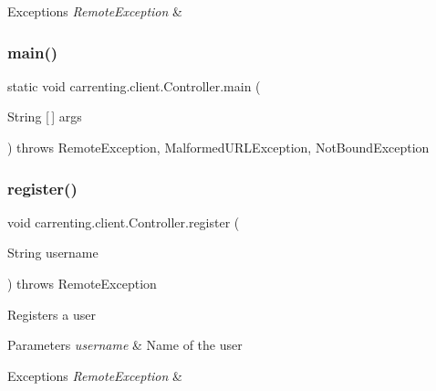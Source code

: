 \begin{DoxyExceptions}{Exceptions}
{\em Remote\+Exception} & \\
\hline
\end{DoxyExceptions}
\mbox{\label{classcarrenting_1_1client_1_1_controller_acff3740c4a8e0d3788748ac27206b371}} 
\subsubsection{\texorpdfstring{main()}{main()}}
{\footnotesize\ttfamily static void carrenting.\+client.\+Controller.\+main (\begin{DoxyParamCaption}\item[{String \mbox{[}$\,$\mbox{]}}]{args }\end{DoxyParamCaption}) throws Remote\+Exception, Malformed\+U\+R\+L\+Exception, Not\+Bound\+Exception\hspace{0.3cm}{\ttfamily [static]}}

\mbox{\label{classcarrenting_1_1client_1_1_controller_a642d9b66b13dcba6c1843c0bee2f060e}} 
\subsubsection{\texorpdfstring{register()}{register()}}
{\footnotesize\ttfamily void carrenting.\+client.\+Controller.\+register (\begin{DoxyParamCaption}\item[{String}]{username }\end{DoxyParamCaption}) throws Remote\+Exception}

Registers a user


\begin{DoxyParams}{Parameters}
{\em username} & Name of the user \\
\hline
\end{DoxyParams}

\begin{DoxyExceptions}{Exceptions}
{\em Remote\+Exception} & \\
\hline
\end{DoxyExceptions}
\mbox{\label{classcarrenting_1_1client_1_1_controller_a267c24a1a13732839f548cddfe640f09}} 
